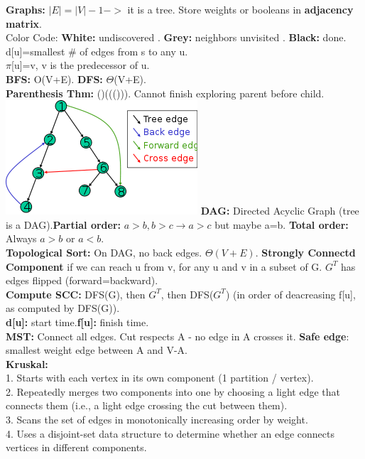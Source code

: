 \documentclass[paper=a4, fontsize=11pt]{scrartcl} %
\begin{document}
\textbf{Graphs: }$|E|=|V|-1 ->$ it is a tree. Store weights or booleans in \textbf{adjacency matrix}.\\
Color Code: \textbf{White:} undiscovered . \textbf{Grey:} neighbors unvisited . \textbf{Black:} done.\\
d[u]=smallest \# of edges from s to any u.\\
$\pi$[u]=v, v is the predecessor of u.\\
\textbf{BFS:} O(V+E). \textbf{DFS:} $\Theta$(V+E).\\
\textbf{Parenthesis Thm:} ()((())). Cannot finish exploring parent before child.\\
\includegraphics{edges.png}
\textbf{DAG:} Directed Acyclic Graph (tree is a DAG).\textbf{Partial order:} $a>b,b>c \rightarrow a>c$ but maybe a=b. \textbf{Total order:} Always $a>b$ or $a<b$.\\
\textbf{Topological Sort:} On DAG, no back edges. $\Theta(V+E)$. \textbf{Strongly Connectd Component } if we can reach u from v, for any u and v in a subset of G. $G^T$ has edges flipped (forward=backward).\\
\textbf{Compute SCC:} DFS(G), then $G^T$, then DFS($G^T$) (in order of deacreasing f[u], as computed by DFS(G)).\\
\textbf{d[u]:} start time.\textbf{f[u]:} finish time.\\
\textbf{MST: }Connect all edges. Cut respects A - no edge in A crosses it.\textbf{ Safe edge}: smallest weight edge between A and V-A.\\
\textbf{Kruskal:}\\
1. Starts	with	each	vertex	in	its	own	component (1 partition / vertex).	\\
2. Repeatedly	merges	two	components	into	one	by	choosing	a	
light	edge	that	connects	them	(i.e.,	a	light	edge	crossing	the	
cut	between	them).	\\
3. Scans	the	set	of	edges	in	monotonically	increasing	order	by	
weight.	\\
4. Uses	a	 disjoint-set	data	structure	 to	determine	whether	an	
edge	connects	vertices	in	different	components.\\
\end{document}
